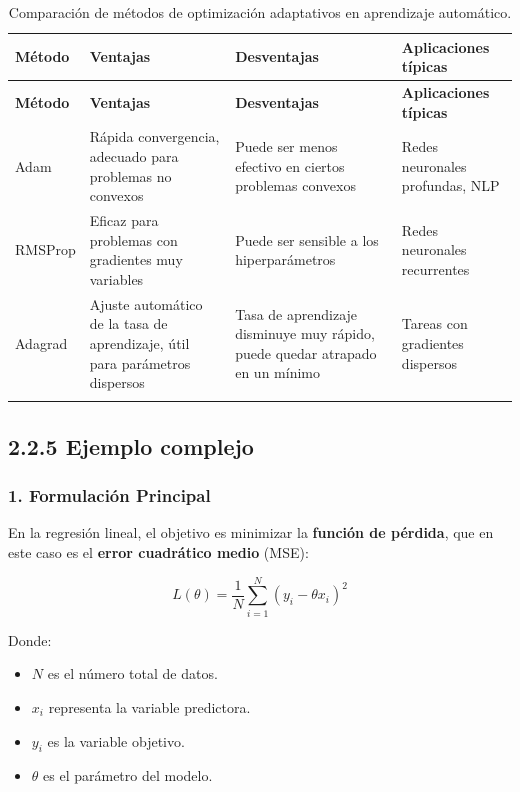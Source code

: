 \documentclass[a5paper]{article}
\begin{document}
	\begin{longtable}{|l|p{3cm}|p{3cm}|p{3cm}|}  
		
		\hline
		\textbf{Método} & \textbf{Ventajas} & \textbf{Desventajas} & \textbf{Aplicaciones típicas} \\ \hline
		\endfirsthead
		\hline
		\textbf{Método} & \textbf{Ventajas} & \textbf{Desventajas} & \textbf{Aplicaciones típicas} \\ \hline
		\endhead
		\hline
		Adam           & Rápida convergencia, adecuado para problemas no convexos & Puede ser menos efectivo en ciertos problemas convexos & Redes neuronales profundas, NLP \\ \hline
		RMSProp        & Eficaz para problemas con gradientes muy variables & Puede ser sensible a los hiperparámetros & Redes neuronales recurrentes \\ \hline
		Adagrad        & Ajuste automático de la tasa de aprendizaje, útil para parámetros dispersos & Tasa de aprendizaje disminuye muy rápido, puede quedar atrapado en un mínimo & Tareas con gradientes dispersos \\ \hline
		\caption{Comparación de métodos de optimización adaptativos en aprendizaje automático.} \\
	\end{longtable}
	
	
	
	\subsection*{2.2.5 Ejemplo complejo}
	
	\subsubsection*{1. Formulación Principal}
	
	En la regresión lineal, el objetivo es minimizar la \textbf{función de pérdida}, que en este caso es el \textbf{error cuadrático medio} (MSE):
	
	\[
	L(\theta) = \frac{1}{N} \sum_{i=1}^{N} (y_i - \theta x_i)^2
	\]
	
	Donde:
	\begin{itemize}
		\item \( N \) es el número total de datos.
		\item \( x_i \) representa la variable predictora.
		\item \( y_i \) es la variable objetivo.
		\item \( \theta \) es el parámetro del modelo.
	\end{itemize}
	
\end{document}
